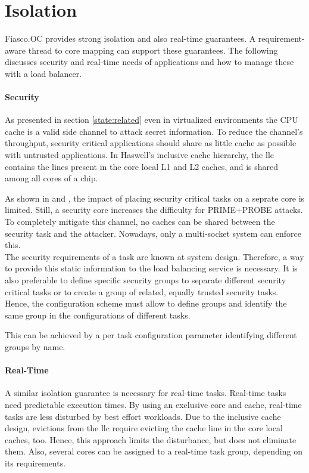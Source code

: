 \section{Isolation}
\label{design:isolation}

Fiasco.OC provides strong isolation and also real-time guarantees.
A requirement-aware thread to core mapping can support these guarantees.
The following discusses security and real-time needs of applications and how to
manage these with a load balancer.

\paragraph{Security}
As presented in section \ref{state:related} even in virtualized environments
the CPU cache is a valid side channel to attack secret information.
To reduce the channel's throughput, security critical applications should share
as little cache as possible with untrusted applications.
In Haswell's inclusive cache hierarchy, the \gls{llc} contains the lines
present in the core local L1 and L2 caches, and is shared among all cores of a
chip.

As shown in \cite{inci_seriously_2015} and \cite{liu_last-level_2015},
the impact of placing security critical tasks on a seprate core is limited.
Still, a security core increases the difficulty for PRIME+PROBE attacks.
To completely mitigate this channel, no caches can be shared between the
security task and the attacker.
Nowadays, only a multi-socket system can enforce this.
\\

The security requirements of a task are known at system design.
Therefore, a way to provide this static information to the load balancing
service is necessary.
It is also preferable to define specific security groups to separate different
security critical tasks or to create a group of related, equally trusted
security tasks.
Hence, the configuration scheme must allow to define groups and identify the
same group in the configurations of different tasks.

This can be achieved by a per task configuration parameter identifying
different groups by name.


\paragraph{Real-Time}
A similar isolation guarantee is necessary for real-time tasks.
Real-time tasks need predictable execution times.
By using an exclusive core and cache, real-time tasks are less disturbed by best
effort workloads.
Due to the inclusive cache design, evictions from the \gls{llc} require
evicting the cache line in the core local caches, too.
Hence, this approach limits the disturbance, but does not eliminate them.
Also, several cores can be assigned to a real-time task group, depending on its
requirements.

